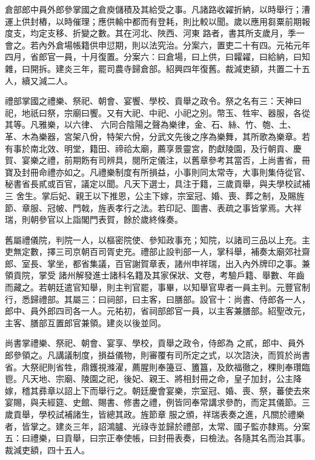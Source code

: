 \begin{pinyinscope}
 倉部郎中員外郎參掌國之倉庾儲積及其給受之事。凡諸路收糴折納，以時舉行；漕運上供封樁，以時催理；應供輸中都而有登耗，則比較以聞。歲以應用芻粟前期報度支，均定支移、折變之數。其在河北、陜西、河東
 路者，書其所支歲月，季一會之。若內外倉場帳籍供申愆期，則以法究治。分案六，置吏二十有四。元祐元年四月，省郎官一員，十月復置。分案六：曰倉場，曰上供，曰糶糴，曰給納，曰知雜，曰開拆。建炎三年，罷司農寺歸倉部。紹興四年復舊。裁減吏額，共置二十五人，續又減二人。



 禮部掌國之禮樂、祭祀、朝會、宴饗、學校、貢舉之政令。祭之名有三：天神曰祀，地祇曰祭，宗廟曰饗。又有大祀、中祀、小祀之別。幣玉、牲牢、器服，各從其等。凡雅樂，以六律、
 六同合陰陽之聲為樂律，金、石、絲、竹、匏、土、革、木為樂器，宮架八佾，特架六佾，分武文先後之序為樂舞，其所歌為樂章。若有事於南北效、明堂，籍田、禘祫太廟，薦享景靈宮，酌獻陵園，及行朝貢、慶賀、宴樂之禮，前期飭有司辨具，閱所定儀注，以舊章參考其當否，上尚書省，冊寶及封冊命禮亦如之。凡禮樂制度有所損益，小事則同太常寺，大事則集侍從官、秘書省長貳或百官，議定以聞。凡天下選士，具注于籍，三歲貢舉，與夫學校試補三
 舍生。掌后妃、親王以下推恩，公主下嫁，宗室冠、婚、喪、葬之制，及賜旌節、章服、冠帔、門戟，旌表孝行之法。若印記、圖書、表疏之事皆掌焉。大祥瑞，則朝參官以上詣閣門表賀，餘於歲終條奏。



 舊屬禮儀院，判院一人，以樞密院使、參知政事充；知院，以諸司三品以上充。主吏無定數，擇三司京朝百司胥史充。禮部止設判部一人，掌科舉，補奏太廟郊社齋郎、室長、掌坐，都省集議，百官謝賀章表，諸州申祥瑞，出入內外牌印之事。兼領貢院，掌受
 諸州解發進士諸科名籍及其家保狀、文卷，考驗戶籍、舉數、年齒而藏之。若朝廷遣官知舉，則主判官罷，事畢，以知舉官卑者一員主判。元豐官制行，悉歸禮部。其屬三：曰祠部，曰主客，曰膳部。設官十：尚書、侍郎各一人，郎中、員外郎四司各一人。元祐初，省祠部郎官一員，以主客兼膳部。紹聖改元，主客、膳部互置郎官兼領。建炎以後並同。



 尚書掌禮樂、祭祀、朝會、宴享、學校，貢舉之政令，侍郎為
 之貳，郎中、員外郎參領之。凡講議制度，損益儀物，則審覆有司所定之式，以次諮決，而質於尚書省。大祭祀則省牲，鼎鑊視滌濯，薦腥則奉籩豆、簠簋，及飲福徹之，稞則奉瓚臨鬯。凡天地、宗廟、陵園之祀，後妃、親王、將相封冊之命，皇子加封，公主降嫁，稽其彞章以詔上下而舉行之。朝廷慶會宴樂，宗室冠、婚、喪、祭，蕃使去來宴賜，與夫經筵、史館、賜書、修書之禮，例皆同奉常講求參酌，而定其儀節。三歲貢舉，學校試補諸生，皆總其政。旌節章
 服之頒，祥瑞表奏之進，凡關於禮樂者，皆掌之。建炎三年，詔鴻臚、光祿寺並歸於禮部，太常、國子監亦隸焉。分案五：曰禮樂，曰貢舉，曰宗正奉使帳，曰封冊表奏，曰檢法。各隨其名而治其事。裁減吏額，四十五人。




\end{pinyinscope}
